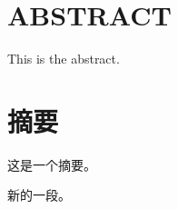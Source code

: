 
\chapter{\bf{ABSTRACT}}%

This is the abstract.


\chapter[摘\quad 要]{摘\quad 要}%
\linespread{1.5}

这是一个摘要。

\vspace{-3pt}新的一段。


